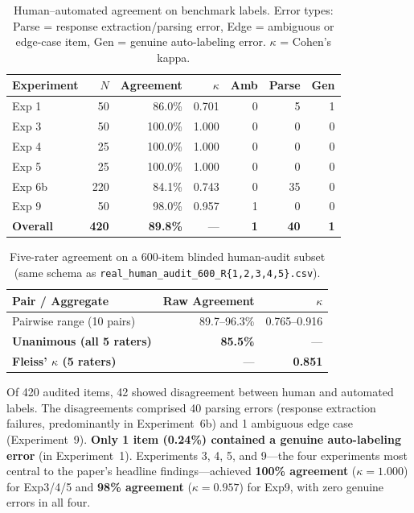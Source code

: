 \documentclass[10pt]{article}
\begin{document}
\begin{table}[h]
\centering
\caption{Human--automated agreement on benchmark labels. Error types:
  Parse = response extraction/parsing error, Edge = ambiguous or edge-case item,
  Gen = genuine auto-labeling error. $\kappa$ = Cohen's kappa.}
\label{tab:human-audit}
\small
\begin{tabular}{lrrrrrr}
\toprule
Experiment & $N$ & Agreement & $\kappa$ & Amb & Parse & Gen \\
\midrule
Exp 1 & 50 & 86.0\% & 0.701 & 0 & 5 & 1 \\
Exp 3 & 50 & 100.0\% & 1.000 & 0 & 0 & 0 \\
Exp 4 & 25 & 100.0\% & 1.000 & 0 & 0 & 0 \\
Exp 5 & 25 & 100.0\% & 1.000 & 0 & 0 & 0 \\
Exp 6b & 220 & 84.1\% & 0.743 & 0 & 35 & 0 \\
Exp 9 & 50 & 98.0\% & 0.957 & 1 & 0 & 0 \\
\midrule
\textbf{Overall} & \textbf{420} & \textbf{89.8\%} & --- & \textbf{1} & \textbf{40} & \textbf{1} \\
\bottomrule
\end{tabular}
\end{table}

\begin{table}[h]
\centering
\caption{Five-rater agreement on a 600-item blinded human-audit subset
  (same schema as \texttt{real\_human\_audit\_600\_R\{1,2,3,4,5\}.csv}).}
\label{tab:human-audit-multirater}
\small
\begin{tabular}{lrr}
\toprule
Pair / Aggregate & Raw Agreement & $\kappa$ \\
\midrule
Pairwise range (10 pairs) & 89.7--96.3\% & 0.765--0.916 \\
\midrule
\textbf{Unanimous (all 5 raters)} & \textbf{85.5\%} & --- \\
\textbf{Fleiss' $\kappa$ (5 raters)} & --- & \textbf{0.851} \\
\bottomrule
\end{tabular}
\end{table}

Of 420 audited items, 42 showed disagreement between human and automated labels.
The disagreements comprised 40 parsing errors (response extraction failures, predominantly in Experiment~6b) and 1 ambiguous edge case (Experiment~9). \textbf{Only 1 item (0.24\%) contained a genuine auto-labeling error} (in Experiment~1).
Experiments 3, 4, 5, and 9---the four experiments most central to the paper's headline findings---achieved \textbf{100\% agreement} ($\kappa = 1.000$) for Exp3/4/5 and \textbf{98\% agreement} ($\kappa = 0.957$) for Exp9, with zero genuine errors in all four.
\end{document}
